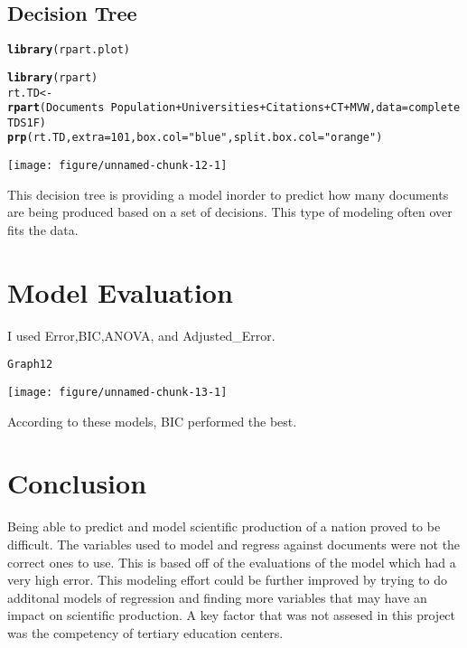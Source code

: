 \documentclass{article}\usepackage[]{graphicx}\usepackage[]{color}
\makeatletter
\def\maxwidth{ %
  \ifdim\Gin@nat@width>\linewidth
    \linewidth
  \else
    \Gin@nat@width
  \fi
}
\newcommand{\hlnum}[1]{\textcolor[rgb]{0.686,0.059,0.569}{#1}}%
\newcommand{\hlstr}[1]{\textcolor[rgb]{0.192,0.494,0.8}{#1}}%
\newcommand{\hlopt}[1]{\textcolor[rgb]{0,0,0}{#1}}%
\newcommand{\hlstd}[1]{\textcolor[rgb]{0.345,0.345,0.345}{#1}}%
\newcommand{\hlkwb}[1]{\textcolor[rgb]{0.69,0.353,0.396}{#1}}%
\newcommand{\hlkwc}[1]{\textcolor[rgb]{0.333,0.667,0.333}{#1}}%
\newcommand{\hlkwd}[1]{\textcolor[rgb]{0.737,0.353,0.396}{\textbf{#1}}}%
\newenvironment{kframe}{%
 \def\at@end@of@kframe{}%
 \ifinner\ifhmode%
  \def\at@end@of@kframe{\end{minipage}}%
  \begin{minipage}{\columnwidth}%
 \fi\fi%
 \def\FrameCommand##1{\hskip\@totalleftmargin \hskip-\fboxsep
 \colorbox{shadecolor}{##1}\hskip-\fboxsep
     \hskip-\linewidth \hskip-\@totalleftmargin \hskip\columnwidth}%
 \MakeFramed {\advance\hsize-\width
   \@totalleftmargin\z@ \linewidth\hsize
   \@setminipage}}%
 {\par\unskip\endMakeFramed%
 \at@end@of@kframe}
\newenvironment{knitrout}{}{} %
\makeatother
\begin{document}
\subsection{Decision Tree}
\begin{knitrout}
\color{fgcolor}\begin{kframe}
\begin{alltt}
\hlkwd{library}\hlstd{(rpart.plot)}
\end{alltt}


{\ttfamily\noindent\itshape\color{messagecolor}{\#\# Loading required package: rpart}}\begin{alltt}
\hlkwd{library}\hlstd{(rpart)}
\hlstd{rt.TD} \hlkwb{<-}\hlkwd{rpart}\hlstd{(Documents} \hlopt{~} \hlstd{Population} \hlopt{+} \hlstd{Universities} \hlopt{+} \hlstd{Citations} \hlopt{+} \hlstd{CT} \hlopt{+} \hlstd{MVW,} \hlkwc{data} \hlstd{= completeTDS1F)}
\hlkwd{prp}\hlstd{(rt.TD,} \hlkwc{extra} \hlstd{=}\hlnum{101} \hlstd{,} \hlkwc{box.col} \hlstd{=}\hlstr{"blue"} \hlstd{,} \hlkwc{split.box.col} \hlstd{=} \hlstr{"orange"}\hlstd{)}
\end{alltt}
\end{kframe}
\texttt{[image: figure/unnamed-chunk-12-1]} 

\end{knitrout}
This decision tree is providing a model inorder to predict how many documents are being produced based on a set of decisions. This type of modeling often over fits the data.\cite{james2013introduction}
\section{Model Evaluation}
I used Error,BIC,ANOVA, and Adjusted_Error. 
\begin{knitrout}
\color{fgcolor}\begin{kframe}
\begin{alltt}
\hlstd{Graph12}
\end{alltt}
\end{kframe}
\texttt{[image: figure/unnamed-chunk-13-1]} 

\end{knitrout}
According to these models, BIC performed the best. 
\section{Conclusion}
Being able to predict and model scientific production of a nation proved to be difficult. The variables used to model and regress against documents were not the correct ones to use. This is based off of the evaluations of the model which had a very high error. This modeling effort could be further improved by trying to do additonal models of regression and finding more variables that may have an impact on scientific production. A key factor that was not assesed in this project was the competency of tertiary education centers.\cite{blomeke2013modeling}\cite{psacharopoulos1985returns}
\end{document}
